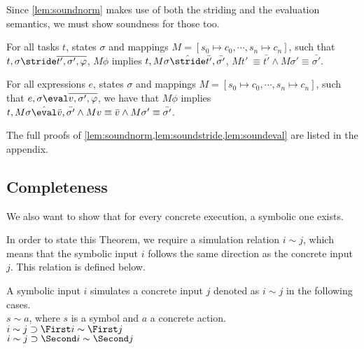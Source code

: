 Since \cref{lem:soundnorm} makes use of both the striding and the evaluation semantics,
we must show soundness for those too.

\begin{lemma}
  \label{lem:soundstride}

  For all tasks $t$, states $\sigma$ and mappings $M=[s_0\mapsto c_0,\cdots,s_n\mapsto c_n]$,
  such that $t,\sigma\stride \overline{t',\sigma',\phi}$,
  $M \phi$ implies
  $t,M\sigma \hat{\stride}\bar{t'},\bar{\sigma'}$, $M t'\ \equiv \bar{t'} \land M\sigma' \equiv \bar{\sigma'}$.

\end{lemma}

\begin{lemma}
  \label{lem:soundeval}

  For all expressions $e$, states $\sigma$ and mappings $M=[s_0\mapsto c_0,\cdots,s_n\mapsto c_n]$,
  such that $e,\sigma\eval \overline{v,\sigma',\phi}$,
  we have that $M\phi$ implies
  $t,M\sigma \hat{\eval}\bar{v},\bar{\sigma'} \land Mv \equiv \bar{v} \wedge M\sigma' \equiv \bar{\sigma'}$.

\end{lemma}

The full proofs of \cref{lem:soundnorm,lem:soundstride,lem:soundeval} are listed in the appendix.





\subsection{Completeness}

We also want to show that for every concrete execution, a symbolic one exists.

In order to state this Theorem, we require a simulation relation $i\sim j$, which means that the symbolic input $i$ follows the same direction as the concrete input $j$.
This relation is defined below.

\begin{definition}
  A symbolic input $i$ simulates a concrete input $j$ denoted as $i\sim j$ in the following cases.\\
  $s\sim a$, where $s$ is a symbol and $a$ a concrete action.\\
  $i\sim j\implies \First i \sim \First j$\\
  $i\sim j\implies \Second i \sim \Second j$
\end{definition}

